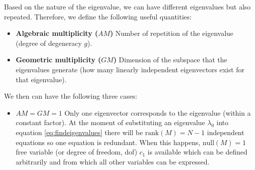 Based on the nature of the eigenvalue, we can have different eigenvalues but also repeated. Therefore, we define the 
following useful quantities:
\begin{itemize}[itemsep=0pt,topsep=0pt]
    \item\textbf{Algebraic multiplicity ($AM$)} Number of repetition of the eigenvalue (degree of degeneracy $g$).
    \item\textbf{Geometric multiplicity ($GM$)} Dimension of the subspace that the eigenvalues generate (how many linearly independent eigenvectors exist
    for that eigenvalue).
\end{itemize}

We then can have the following three cases:
\begin{itemize}
    \item\textbf{$AM=GM=1$} Only one eigenvector corresponds to the eigenvalue (within a constant factor).
    At the moment of substituting an eigenvalue $\lambda_0$ into equation \eqref{eq:findeigenvalues} there will be $\text{rank}(M)=N-1$ 
    independent equations so one equation is redundant. When this happens, $\text{null}(M)=1$ free variable (or degree of freedom, dof) $c_1$ is available which can
    be defined arbitrarily and from which all other variables can be expressed.


\end{itemize}
